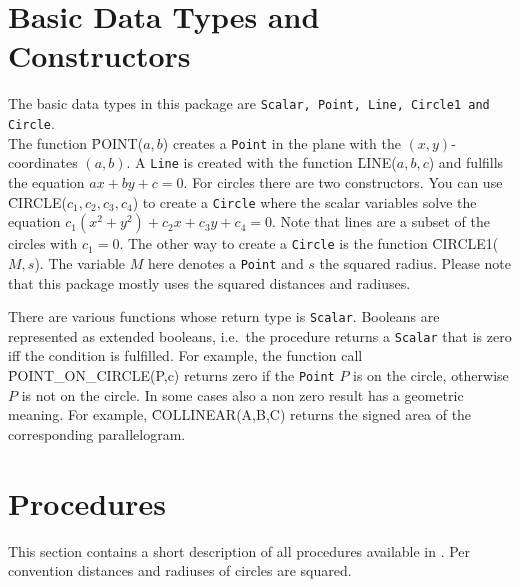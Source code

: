 \section{Basic Data Types and Constructors}

The basic data types in this package are {\tt Scalar, Point, Line, Circle1
and Circle}. \\ 
The function \f{POINT($a,b$)} creates a {\tt Point} in the plane with
the $(x,y)$-coordinates $(a,b)$. 
A {\tt Line} is created with the function \f{LINE($a,b,c$)} and 
fulfills the equation $ ax + by + c = 0$. 
For circles there are two constructors. You can use 
\f{CIRCLE($c_1,c_2,c_3,c_4$)} to create a {\tt Circle} where 
the scalar variables solve the equation $c_1(x^2+y^2) + c_2x + c_3y + c_4 = 0$. 
Note that lines are a subset of the circles with $c_1=0$. The other way
to create a {\tt Circle} is the function \f{CIRCLE1($M,s$)}. 
The variable $M$ here denotes a {\tt Point} and $s$ the squared
radius. Please note that this package mostly uses the squared distances and
radiuses.


There are various functions whose return type is {\tt Scalar}.
Booleans are represented as extended booleans, i.e.\ the 
procedure returns a {\tt Scalar} that is zero iff the condition is fulfilled.
For example, the function call \f{POINT\_ON\_CIRCLE(P,c)} returns zero if 
the {\tt Point} $P$ is on the circle, otherwise $P$ is not on the circle. 
In some cases also a non zero result has a geometric meaning. For example, 
\f{COLLINEAR(A,B,C)} returns the signed area of the corresponding
parallelogram.


\section{Procedures}

This section contains a short description of all procedures available
in \geo. Per convention distances and radiuses of circles are squared. 

\bigskip

